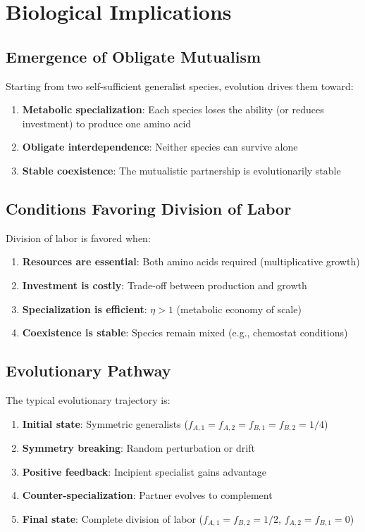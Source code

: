 \documentclass[11pt]{article}
\theoremstyle{definition}
\theoremstyle{remark}
\begin{document}
\section{Biological Implications}

\subsection{Emergence of Obligate Mutualism}

Starting from two self-sufficient generalist species, evolution drives them toward:
\begin{enumerate}
    \item \textbf{Metabolic specialization}: Each species loses the ability (or reduces investment) to produce one amino acid
    \item \textbf{Obligate interdependence}: Neither species can survive alone
    \item \textbf{Stable coexistence}: The mutualistic partnership is evolutionarily stable
\end{enumerate}

\subsection{Conditions Favoring Division of Labor}

Division of labor is favored when:
\begin{enumerate}
    \item \textbf{Resources are essential}: Both amino acids required (multiplicative growth)
    \item \textbf{Investment is costly}: Trade-off between production and growth
    \item \textbf{Specialization is efficient}: $\eta > 1$ (metabolic economy of scale)
    \item \textbf{Coexistence is stable}: Species remain mixed (e.g., chemostat conditions)
\end{enumerate}

\subsection{Evolutionary Pathway}

The typical evolutionary trajectory is:

\begin{enumerate}
    \item \textbf{Initial state}: Symmetric generalists ($f_{A,1} = f_{A,2} = f_{B,1} = f_{B,2} = 1/4$)
    \item \textbf{Symmetry breaking}: Random perturbation or drift
    \item \textbf{Positive feedback}: Incipient specialist gains advantage
    \item \textbf{Counter-specialization}: Partner evolves to complement
    \item \textbf{Final state}: Complete division of labor ($f_{A,1} = f_{B,2} = 1/2$, $f_{A,2} = f_{B,1} = 0$)
\end{enumerate}
\end{document}
